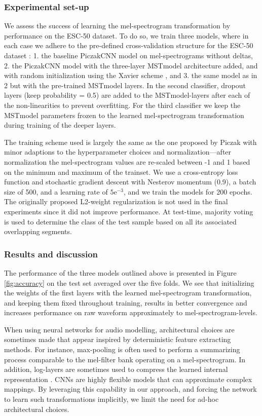 \documentclass{article}
\begin{document}
\subsubsection{Experimental set-up}
We assess the success of learning the mel-spectrogram transformation by performance on the ESC-50 dataset. To do so, we train three models, where in each case we adhere to the pre-defined cross-validation structure for the ESC-50 dataset \cite{piczak2015environmental}: 1. the baseline PiczakCNN model on mel-spectrograms without deltas, 2. the PiczakCNN model with the three-layer MSTmodel architecture added, and with random initialization using the Xavier scheme \cite{pmlr-v9-glorot10a}, and 3. the same model as in 2 but with the pre-trained MSTmodel layers. In the second classifier, dropout layers (keep probability = 0.5) are added to the MSTmodel-layers after each of the non-linearities to prevent overfitting. For the third classifier we keep the MSTmodel parameters frozen to the learned mel-spectrogram transformation during training of the deeper layers. 

The training scheme used is largely the same as the one proposed by Piczak \cite{piczak2015environmental} with minor adaptions to the hyperparameter choices and normalization---after normalization the mel-spectrogram values are re-scaled between -1 and 1 based on the minimum and maximum of the trainset. We use a cross-entropy loss function and stochastic gradient descent with Nesterov momentum (0.9), a batch size of 500, and a learning rate of $\mathrm{5e^{-3}}$, and we train the models for 200 epochs. The originally proposed L2-weight regularization is not used in the final experiments since it did not improve performance. At test-time, majority voting is used to determine the class of the test sample based on all its associated overlapping segments.

\subsubsection{Results and discussion}
The performance of the three models outlined above is presented in Figure \ref{fig:accuracy} on the test set averaged over the five folds. We see that initializing the weights of the first layers with the learned mel-spectrogram transformation, and keeping them fixed throughout training, results in better convergence and increases performance on raw waveform approximately to mel-spectrogram-levels.


When using neural networks for audio modelling, architectural choices are sometimes made that appear inspired by deterministic feature extracting methods. For instance, max-pooling is often used to perform a summarizing process comparable to the mel-filter bank operating on a mel-spectrogram. In addition, log-layers are sometimes used to compress the learned internal representation \cite{sainath2015learning}\cite{hoshen_speech_2015}. CNNs are highly flexible models that can approximate complex mappings. By leveraging this capability in our approach, and forcing the network to learn such transformations implicitly, we limit the need for ad-hoc architectural choices.
\end{document}
